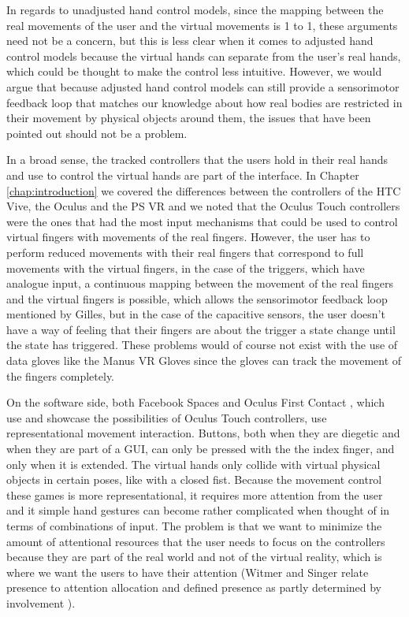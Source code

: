 In regards to unadjusted hand control models, since the mapping between the real movements of the user and the virtual movements is 1 to 1, these arguments need not be a concern, but this is less clear when it comes to adjusted hand control models because the virtual hands can separate from the user's real hands, which could be thought to make the control less intuitive. However, we would argue that because adjusted hand control models can still provide a sensorimotor feedback loop \parencite{Gillies2014} that matches our knowledge about how real bodies are restricted in their movement by physical objects around them, the issues that have been pointed out should not be a problem.

In a broad sense, the tracked controllers that the users hold in their real hands and use to control the virtual hands are part of the interface. In Chapter \ref{chap:introduction} we covered the differences between the controllers of the HTC Vive, the Oculus and the PS VR and we noted that the Oculus Touch controllers were the ones that had the most input mechanisms that could be used to control virtual fingers with movements of the real fingers. However, the user has to perform reduced movements with their real fingers that correspond to full movements with the virtual fingers, in the case of the triggers, which have analogue input, a continuous mapping between the movement of the real fingers and the virtual fingers is possible, which allows the sensorimotor feedback loop mentioned by Gilles, but in the case of the capacitive sensors, the user doesn't have a way of feeling that their fingers are about the trigger a state change until the state has triggered. These problems would of course not exist with the use of data gloves like the Manus VR Gloves since the gloves can track the movement of the fingers completely.

On the software side, both Facebook Spaces \parencite{facebookSpaces} and Oculus First Contact \parencite{firstContact}, which use and showcase the possibilities of Oculus Touch controllers, use representational movement interaction. Buttons, both when they are diegetic and when they are part of a GUI, can only be pressed with the the index finger, and only when it is extended. The virtual hands only collide with virtual physical objects in certain poses, like with a closed fist. Because the movement control these games is more representational, it requires more attention from the user and it simple hand gestures can become rather complicated when thought of in terms of combinations of input. The problem is that we want to minimize the amount of attentional resources that the user needs to focus on the controllers because they are part of the real world and not of the virtual reality, which is where we want the users to have their attention (Witmer and Singer relate presence to attention allocation and defined presence as partly determined by involvement \parencite{Schuemie2001}).

